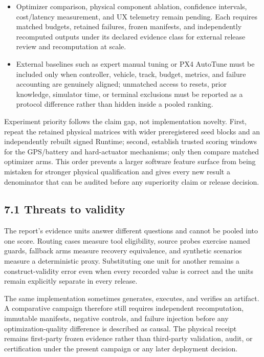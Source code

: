 \begin{itemize}
  depleted-battery stability,
  combined-fault qualification, trusted flight evaluation under the
  verified motor-2 hard stop, and fault-tolerant recovery remain unproved.
\item
  Optimizer comparison, physical component ablation, confidence
  intervals, cost/latency measurement, and UX telemetry remain pending.
  Each requires matched budgets, retained failures, frozen manifests, and
  independently recomputed outputs under its declared evidence class for
  external release review and recomputation at scale.
\item
  External baselines such as expert manual tuning or PX4 AutoTune must
  be included only when controller, vehicle, track, budget, metrics, and
  failure accounting are genuinely aligned; unmatched access to resets,
  prior knowledge, simulator time, or terminal exclusions must be
  reported as a protocol difference rather than hidden inside a pooled
  ranking.
\end{itemize}

Experiment priority follows the claim gap, not implementation novelty. First,
repeat the retained physical matrices with wider preregistered seed blocks and
an independently rebuilt signed Runtime; second, establish trusted scoring
windows for the GPS/battery and hard-actuator mechanisms; only then compare
matched optimizer arms. This order prevents a larger software feature surface
from being mistaken for stronger physical qualification and gives every new
result a denominator that can be audited before any superiority claim or
release decision.

\subsection{\texorpdfstring{\textbf{7.1 Threats to
validity}}{7.1 Threats to validity}}\label{threats-to-validity}

The report's evidence units answer different questions and cannot be
pooled into one score. Routing cases measure tool eligibility, source
probes exercise named guards, fallback arms measure recovery equivalence,
and synthetic scenarios measure a deterministic proxy. Substituting one
unit for another remains a construct-validity error even when every
recorded value is correct and the units remain explicitly separate in
every release.

The same implementation sometimes generates, executes, and verifies an
artifact. A comparative campaign therefore still requires independent
recomputation, immutable manifests, negative controls, and failure
injection before any optimization-quality difference is described as
causal. The physical receipt remains first-party frozen evidence rather
than third-party validation, audit, or certification under the present
campaign or any later deployment decision.

